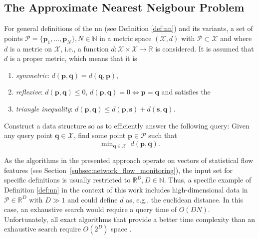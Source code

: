 \documentclass[../../../main.tex]{subfiles}
\begin{document}
\subsection{The Approximate Nearest Neigbour Problem}\label{subsec:approximate_nearest_neighbour_problem}

For general definitions of the \gls{nn} (see Definition \ref{def:nn}) and its variants, a set of points $\mathcal{P} = \{\bm{p}_1, \dots, \bm{p}_N \}, N \in \mathbb{N}$ in a metric space $(\mathcal{X}, d)$ with $\mathcal{P} \subset \mathcal{X}$ and where $d$ is a metric on $\mathcal{X}$, i.e., a function $d: \mathcal{X} \times \mathcal{X} \rightarrow \mathbb{R}$ is considered. It is assumed that $d$ is a proper metric, which means that it is

\begin{enumerate}
    \item \textit{symmetric}: $d(\bm{p},\bm{q})=d(\bm{q},\bm{p})$,
    \item \textit{reflexive}: $d(\bm{p},\bm{q}) \leq 0$, $d(\bm{p},\bm{q})=0 \iff \bm{p}=\bm{q}$ and satisfies the 
    \item \textit{triangle inequality}: $d(\bm{p},\bm{q}) \leq d(\bm{p},\bm{s}) + d(\bm{s},\bm{q})$.
\end{enumerate}

\begin{definition}\label{def:nn}
     Construct a data structure so as to efficiently answer the following query: Given any query point $\bm{q} \in \mathcal{X}$, find some point $\bm{p} \in \mathcal{P}$ such that
    \begin{equation}
        \mathop{\text{min}}_{\bm{q} \in \mathcal{X}} \; d(\bm{p}, \bm{q}).
    \end{equation}
\end{definition}

As the algorithms in the presented approach operate on vectors of statistical flow features (see Section~\ref{subsec:network_flow_monitoring}), the input set for specific definitions is usually restricted to $\mathbb{R}^D, D \in \mathbb{N}$. Thus, a specific example of Definition \ref{def:nn} in the context of this work includes high-dimensional data in $\mathcal{P} \in \mathbb{R}^D$ with $D \gg 1$ and could define $d$ as, e.g., the euclidean distance. In this case, an exhaustive search would require a query time of $O(DN)$. Unfortunately, all exact algorithms that provide a better time complexity than an exhaustive search require $O(2^D)$ space \cite{rubinstein2018hardness}. 
\end{document}
